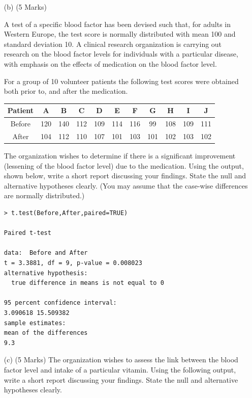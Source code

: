 \documentclass[a4paper,12pt]{article}
\begin{document}
\begin{itemize}
\begin{framed}
\begin{verbatim}
		\end{verbatim}
	\end{framed}
\newpage	
\item[(b)] (5 Marks)

A test of a specific blood factor has been devised such that, for adults in Western Europe, the test score is normally distributed with mean 100 and standard deviation 10. A clinical research organization is carrying out research on the blood factor levels for individuals with a particular disease, with emphasis on the effects of medication on the blood factor level.

For a group of 10 volunteer patients the following test scores were obtained both prior to, and after the medication.

\begin{center}
\begin{tabular}{|c||c|c|c|c|c|c|c|c|c|c|} \hline 
Patient	& A	& B	& C	& D	& E	& F	& G &	H &	I &	J	\\ \hline  \hline
Before	& 120& 	140	& 112 &	109&	114	& 116 &	99 & 	108 &	109	& 111 \\ \hline 	
After	& 104&	112	& 110 &	107&	101	& 103 &	101	& 102&	103	& 102 \\ \hline 
\end{tabular} 
\end{center}
	


The organization wishes to determine if there is a significant improvement (lessening of the blood factor level) due to the medication.  Using the output, shown below, write a short report discussing your findings. State the null and alternative hypotheses clearly. (You may assume that the case-wise differences are normally distributed.)

\begin{framed}
\begin{verbatim}
> t.test(Before,After,paired=TRUE)

Paired t-test

data:  Before and After
t = 3.3881, df = 9, p-value = 0.008023
alternative hypothesis: 
  true difference in means is not equal to 0
  
95 percent confidence interval:
3.090618 15.509382
sample estimates:
mean of the differences 
9.3 
\end{verbatim}
\end{framed}
\bigskip

\item[(c)] (5 Marks)
The organization wishes to assess the link between the blood factor level and intake of a particular vitamin.  Using the following output, write a short report discussing your findings. State the null and alternative hypotheses clearly.


\end{itemize}
\end{document}
